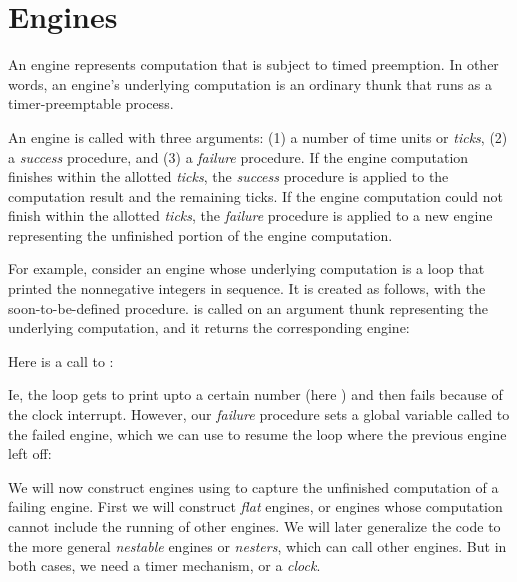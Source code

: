 \chapter{Engines}

An engine \cite{engine} represents computation that is
subject to timed preemption.  In other words, an
engine's underlying computation is an ordinary thunk
that runs as a timer-preemptable process.

An engine is called with three arguments: (1) a number
of time units or {\em ticks}, (2) a {\em success}
procedure, and (3) a {\em failure} procedure.  If the
engine computation finishes within the allotted {\em
ticks}, the {\em success} procedure is applied to the
computation result and the remaining ticks.  If the
engine computation could not finish within the allotted
{\em ticks}, the {\em failure} procedure is applied
to a new engine representing the unfinished portion of
the engine computation.

For example, consider an engine whose underlying
computation is a loop that printed the nonnegative
integers in sequence.  It is created as follows, with
the soon-to-be-defined  procedure.
 is called on an argument thunk
representing the underlying computation, and it
returns the corresponding engine:


\n Here is a call to :


\n Ie, the loop gets to print upto a certain number
(here ) and then fails because of the clock
interrupt.  However, our {\em failure} procedure sets
a global variable called  to the failed
engine, which we can use to resume the loop where the
previous engine left off:



We will now construct engines using  to
capture the unfinished computation of a failing engine.
First we will construct {\em flat} engines, or
engines whose computation cannot include the running of
other engines.  We will later generalize the code to
the more general {\em nestable} engines or {\em
nesters}, which can call other engines.  But in both
cases, we need a timer mechanism, or a {\em clock}.


